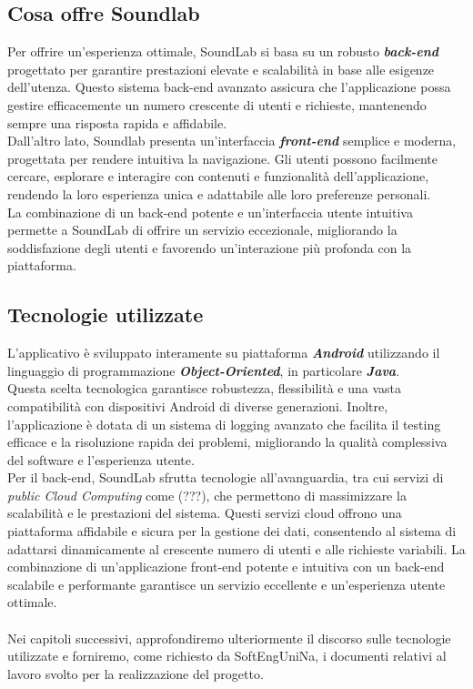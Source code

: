 \documentclass{article}
\begin{document}
		\subsection{Cosa offre Soundlab}
		Per offrire un'esperienza ottimale, SoundLab si basa su un robusto \textbf{\textit{\textcolor{dark_purple}{back-end}}} progettato per garantire prestazioni elevate e scalabilità in base alle esigenze dell'utenza. Questo sistema back-end avanzato assicura che l'applicazione possa gestire efficacemente un numero crescente di utenti e richieste, mantenendo sempre una risposta rapida e affidabile.\\
		Dall'altro lato, Soundlab presenta un'interfaccia \textbf{\textit{\textcolor{dark_purple}{front-end}}} semplice e moderna, progettata per rendere intuitiva la navigazione. Gli utenti possono facilmente cercare, esplorare e interagire con contenuti e funzionalità dell'applicazione, rendendo la loro esperienza unica e adattabile alle loro preferenze personali.\\ 
		La combinazione di un back-end potente e un'interfaccia utente intuitiva permette a SoundLab di offrire un servizio eccezionale, migliorando la soddisfazione degli utenti e favorendo un'interazione più profonda con la piattaforma.
		\subsection{Tecnologie utilizzate}
		L'applicativo è sviluppato interamente su piattaforma \textbf{\textit{\textcolor{dark_purple}{Android}}} utilizzando il linguaggio di programmazione \textbf{\textit{\textcolor{dark_purple}{Object-Oriented}}}, in particolare \textbf{\textit{\textcolor{dark_purple}{Java}}}.\\
		Questa scelta tecnologica garantisce robustezza, flessibilità e una vasta compatibilità con dispositivi Android di diverse generazioni. Inoltre, l'applicazione è dotata di un sistema di logging avanzato che facilita il testing efficace e la risoluzione rapida dei problemi, migliorando la qualità complessiva del software e l'esperienza utente.\\
		Per il back-end, SoundLab sfrutta tecnologie all'avanguardia, tra cui servizi di \textit{public Cloud Computing} come (???), che permettono di massimizzare la scalabilità e le prestazioni del sistema. Questi servizi cloud offrono una piattaforma affidabile e sicura per la gestione dei dati, consentendo al sistema di adattarsi dinamicamente al crescente numero di utenti e alle richieste variabili. La combinazione di un'applicazione front-end potente e intuitiva con un back-end scalabile e performante garantisce un servizio eccellente e un'esperienza utente ottimale.
		\\
		\\
		Nei capitoli successivi, approfondiremo ulteriormente il discorso sulle tecnologie utilizzate e forniremo, come richiesto da SoftEngUniNa, i documenti relativi al lavoro svolto per la realizzazione del progetto.
\end{document}
